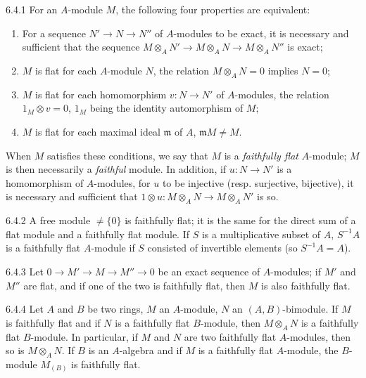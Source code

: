 \begin{env}{6.4.1}
\label{env-0.6.4.1}
For an $A$-module $M$, the following four properties are equivalent:
\begin{enumerate}[label=(\alph*)]
  \item For a sequence $N'\to N\to N''$ of $A$-modules to be exact, it is necessary and
        sufficient that the sequence $M\otimes_A N'\to M\otimes_A N\to M\otimes_A N''$ is
        exact;
  \item $M$ is flat for each $A$-module $N$, the relation $M\otimes_A N=0$ implies $N=0$;
  \item $M$ is flat for each homomorphism $v:N\to N'$ of $A$-modules, the relation
        $1_M\otimes v=0$, $1_M$ being the identity automorphism of $M$;
  \item $M$ is flat for each maximal ideal $\mathfrak{m}$ of $A$, $\mathfrak{m}M\neq M$.
\end{enumerate}

When $M$ satisfies these conditions, we say that $M$ is a \emph{faithfully flat} $A$-module;
$M$ is then necessarily a \emph{faithful} module. In addition, if $u:N\to N'$ is a
homomorphism of $A$-modules, for $u$ to be injective (resp. surjective, bijective), it is
necessary and sufficient that $1\otimes u:M\otimes_A N\to M\otimes_A N'$ is so.
\end{env}

\begin{env}{6.4.2}
\label{env-0.6.4.2}
A free module $\neq\{0\}$ is faithfully flat; it is the same for the direct sum of a flat
module and a faithfully flat module. If $S$ is a multiplicative subset of $A$, $S^{-1}A$ is
a faithfully flat $A$-module if $S$ consisted of invertible elements (so $S^{-1}A=A$).
\end{env}

\begin{env}{6.4.3}
\label{env-0.6.4.3}
Let $0\to M'\to M\to M''\to 0$ be an exact sequence of $A$-modules; if $M'$ and $M''$ are
flat, and if one of the two is faithfully flat, then $M$ is also faithfully flat.
\end{env}

\begin{env}{6.4.4}
\label{env-0.6.4.4}
Let $A$ and $B$ be two rings, $M$ an $A$-module, $N$ an $(A,B)$-bimodule. If $M$ is
faithfully flat and if $N$ is a faithfully flat $B$-module, then $M\otimes_A N$ is a
faithfully flat $B$-module. In particular, if $M$ and $N$ are two faithfully flat
$A$-modules, then so is $M\otimes_A N$. If $B$ is an $A$-algebra and if $M$ is a faithfully
flat $A$-module, the $B$-module $M_{(B)}$ is faithfully flat.
\end{env}

